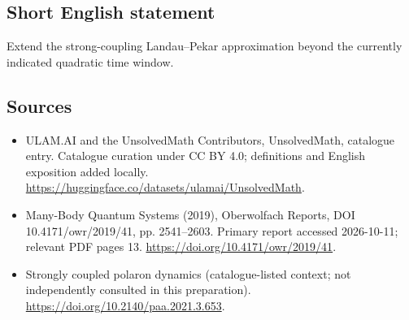 \documentclass[11pt]{article}
\begin{document}
\subsection{Short English statement}
Extend the strong-coupling Landau--Pekar approximation beyond the currently indicated quadratic time window.
\subsection{Sources}
\begin{itemize}
\item[\hypertarget{source:statement:1}{S1}] ULAM.AI and the UnsolvedMath Contributors, UnsolvedMath, catalogue entry. Catalogue curation under CC BY 4.0; definitions and English exposition added locally.
\url{https://huggingface.co/datasets/ulamai/UnsolvedMath}.
\item[\hypertarget{source:statement:2}{S2}] Many-Body Quantum Systems (2019), Oberwolfach Reports, DOI 10.4171/owr/2019/41, pp. 2541--2603. Primary report accessed 2026-10-11; relevant PDF pages 13.
\url{https://doi.org/10.4171/owr/2019/41}.
\item[\hypertarget{source:statement:3}{S3}] Strongly coupled polaron dynamics (catalogue-listed context; not independently consulted in this preparation).
\url{https://doi.org/10.2140/paa.2021.3.653}.
\end{itemize}
\label{end:statement}
\end{document}
